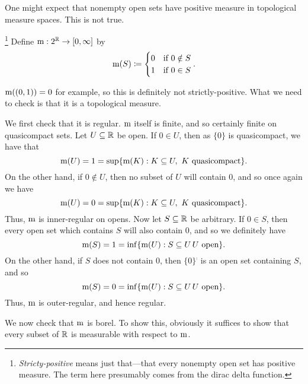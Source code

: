 One might expect that nonempty open sets have positive measure in topological measure spaces.  This is not true.
\begin{exm}\footnote{\emph{Stricty-positive} means just that---that every nonempty open set has positive measure.  The term here presumably comes from the dirac delta function.}
Define $\mathrm{m} :2^{\mathbb{R}} \rightarrow [0,\infty ]$ by
\begin{equation}
\mathrm{m} (S)\coloneqq \begin{cases}0 & \text{if }0\notin S \\ 1 & \text{if }0\in S\end{cases}.
\end{equation}

$\mathrm{m} ((0,1))=0$ for example, so this is definitely not strictly-positive.  What we need to check is that it is a topological measure.

We first check that it is regular.  $\mathrm{m}$ itself is finite, and so certainly finite on quasicompact sets.  Let $U\subseteq \mathbb{R}$ be open.  If $0\in U$, then as $\{ 0\}$ is quasicompact, we have that
\begin{equation}
\mathrm{m} (U)=1=\sup \{ \mathrm{m} (K):K\subseteq U,\ K\text{ quasicompact}\} .
\end{equation}
On the other hand, if $0\notin U$, then no subset of $U$ will contain $0$, and so once again we have
\begin{equation}
\mathrm{m} (U)=0=\sup \{ \mathrm{m} (K):K\subseteq U,\ K\text{ quasicompact}\} .
\end{equation}
Thus, $\mathrm{m}$ is inner-regular on opens.  Now let $S\subseteq \mathbb{R}$ be arbitrary.  If $0\in S$, then every open set which contains $S$ will also contain $0$, and so we definitely have
\begin{equation}
\mathrm{m} (S)=1=\inf \{ \mathrm{m} (U):S\subseteq U\, U\text{ open}\} .
\end{equation}
On the other hand, if $S$ does not contain $0$, then $\{ 0\} ^{\comp}$ is an open set containing $S$, and so
\begin{equation}
\mathrm{m} (S)=0=\inf \{ \mathrm{m} (U):S\subseteq U\, U\text{ open}\} .
\end{equation}
Thus, $\mathrm{m}$ is outer-regular, and hence regular.

We now check that $\mathrm{m}$ is borel.  To show this, obviously it suffices to show that every subset of $\mathbb{R}$ is measurable with respect to $\mathrm{m}$.


\end{exm}
